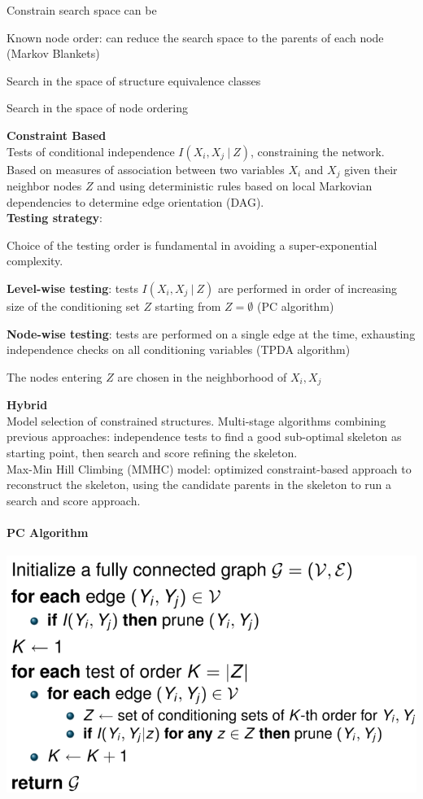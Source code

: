 \documentclass[10pt]{report}
\begin{document}
\begin{list}{}{}
	Constrain search space can be\begin{list}{}{}
		\item Known node order: can reduce the search space to the parents of each node (Markov Blankets)
		\item Search in the space of structure equivalence classes
		\item Search in the space of node ordering
	\end{list}
	\item \textbf{Constraint Based}\\
	Tests of conditional independence $I(X_i,X_j\:|\:Z)$, constraining the network. Based on measures of association between two variables $X_i$ and $X_j$ given their neighbor nodes $Z$ and using deterministic rules based on local Markovian dependencies to determine edge orientation (DAG).\\
	\textbf{Testing strategy}:\begin{list}{}{}
		\item Choice of the testing order is fundamental in avoiding a super-exponential complexity.
		\item \textbf{Level-wise testing}: tests $I(X_i,X_j\:|\:Z)$ are performed in order of increasing size of the conditioning set $Z$ starting from $Z = \emptyset$ (PC algorithm)
		\item \textbf{Node-wise testing}: tests are performed on a single edge at the time, exhausting independence checks on all conditioning variables (TPDA algorithm)
		\item The nodes entering $Z$ are chosen in the neighborhood of $X_i,X_j$
	\end{list}
	\item \textbf{Hybrid}\\
	Model selection of constrained structures. Multi-stage algorithms combining previous approaches: independence tests to find a good sub-optimal skeleton as starting point, then search and score refining the skeleton.\\
	Max-Min Hill Climbing (MMHC) model: optimized constraint-based approach to reconstruct the skeleton, using the candidate parents in the skeleton to run a search and score approach.
\end{list}
\paragraph{PC Algorithm}
\begin{center}
	\includegraphics[scale=0.5]{211.png}
\end{center}
\end{document}
